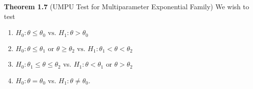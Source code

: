 \documentclass[12pt]{article}
\numberwithin{equation}{section}
\begin{document}
\newpage
\textbf{Theorem 1.7} (UMPU Test for Multiparameter Exponential Family)
We wish to test
%
\begin{enumerate}[(1)]
  \item $H_0: \theta \le \theta_0 \text{ vs. } H_1: \theta > \theta_0$ \\
  
  \item $H_0: \theta \le \theta_1 \text{ or } \theta \ge \theta_2 \text{ vs. } H_1: \theta_1 < \theta < \theta_2$ \\
  
  \item $H_0: \theta_1 \le \theta \le \theta_2$ vs. 
  $H_1: \theta < \theta_1 \text{ or } \theta > \theta_2$ \\
  
  \item $H_0: \theta = \theta_0$ vs. $H_1: \theta \ne \theta_0$. 
\end{enumerate}
\end{document}
